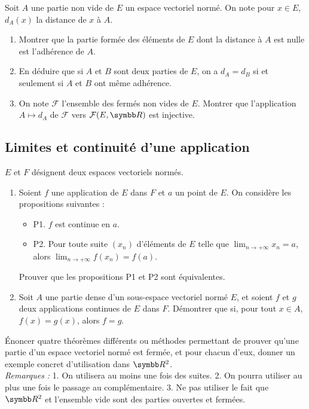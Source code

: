 \begin{exercice}
    Soit $A$ une partie non vide de $E$ un espace vectoriel normé. On note pour $x \in E$, $d_{A}(x)$ la distance de $x$ à $A$.
    \begin{enumerate}
        \item Montrer que la partie formée des éléments de $E$ dont la distance à $A$ est nulle est l'adhérence de $A$.
        \item En déduire que si $A$ et $B$ sont deux parties de $E$, on a $d_{A} = d_{B}$ si et seulement si $A$ et $B$ ont même adhérence.
        \item On note $\mathcal{F}$ l'ensemble des fermés non vides de $E$. 
            Montrer que l'application $A \mapsto d_{A}$ de $\mathcal{F}$ vers $\mathcal{F}(E, \R)$ est injective.
    \end{enumerate}
\end{exercice}

\subsection{Limites et continuité d'une application}
\begin{exercice}
    $E$ et $F$ désignent deux espaces vectoriels normés.
    \begin{enumerate}
        \item Soient $f$ une application de $E$ dans $F$ et $a$ un point de $E$. On considère les propositions suivantes :
        \begin{itemize}
            \item P1. $f$ est continue en $a$.
            \item P2. Pour toute suite $(x_{n})$ d'éléments de $E$ telle que $\lim_{n \rightarrow +\infty} x_{n} = a$, 
                alors $\lim_{n \rightarrow +\infty} f(x_{n}) = f(a)$.
        \end{itemize}
            Prouver que les propositions P1 et P2 sont équivalentes.
        \item Soit $A$ une partie dense d'un sous-espace vectoriel normé $E$, et soient $f$ et $g$ deux applications continues de $E$ dans $F$. 
            Démontrer que si, pour tout $x \in A$, $f(x)=g(x)$, alors $f=g$.
    \end{enumerate}
\end{exercice}

\begin{exercice}
    Énoncer quatre théorèmes différents ou méthodes permettant de prouver qu'une partie d'un espace vectoriel normé est fermée,
    et pour chacun d'eux, donner un exemple concret d'utilisation dans $\R^{2}$. \\

    \textit{Remarques :}
    1. On utilisera au moins une fois des suites.
    2. On pourra utiliser au plus une fois le passage au complémentaire.
    3. Ne pas utiliser le fait que $\R^{2}$ et l'ensemble vide sont des parties ouvertes et fermées.
\end{exercice}

